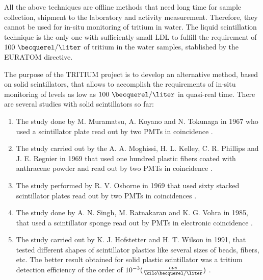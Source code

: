 All the above techniques are offline methods that need long time for sample collection, shipment to the laboratory and activity measurement. Therefore, they cannot be used for in-situ monitoring of tritium in water. The liquid scintillation technique is the only one with sufficiently small LDL to fulfill the requirement of $100~\becquerel/\liter$ of tritium in the water samples, stablished by the EURATOM directive. 

The purpose of the TRITIUM project is to develop an alternative method, based on solid scintillators, that allows to accomplish the requirements of in-situ monitoring of levels as low as $100~\becquerel/\liter$ in quasi-real time. There are several studies with solid scintillators so far:

\begin{enumerate}

\item{} The study done by M. Muramatsu, A. Koyano and N. Tokunaga in 1967 who used a scintillator plate read out by two PMTs in coincidence \cite{Muramatsu}.

\item{} The study carried out by the A. A. Moghissi, H. L. Kelley, C. R. Phillips and J. E. Regnier in 1969 that used one hundred plastic fibers coated with anthracene powder and read out by two PMTs in coincidence \cite{Moghissi}.

\item{} The study performed by R. V. Osborne in 1969 that used sixty stacked scintillator plates read out by two PMTs in coincidences \cite{Osborne}.

\item{} The study done by A. N. Singh, M. Ratnakaran and K. G. Vohra in 1985, that used a scintillator sponge read out by PMTs in electronic coincidence \cite{Ratnakaran, Ratnakaran2000}.

\item{} The study carried out by K. J. Hofstetter and H. T. Wilson in 1991, that tested different shapes of scintillator plastics like several sizes of beads, fibers, etc. The better result obtained for solid plastic scintillator was a tritium detection efficiency of the order of $10^{-3}(\frac{cps}{\kilo\becquerel/\liter})$ \cite{Hofstetter1, Hofstetter2}.

\end{enumerate}
